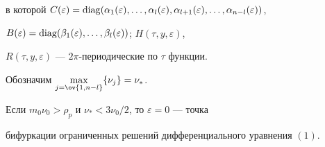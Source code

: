 в которой $C(\varepsilon)=\diag (\alpha_1(\varepsilon),\dotsc, 


\alpha_l(\varepsilon),\alpha_{l+1}(\varepsilon),\dotsc, 


\alpha_{n-l}(\varepsilon))$, 


$B(\varepsilon)=\diag(\beta_1(\varepsilon),\dotsc, 


\beta_l(\varepsilon))$; $H(\tau,y,\varepsilon)$, 


$R(\tau,y,\varepsilon)$ --- $2\pi$-периодические по $\tau$ функции. 


 


Обозначим $\max\limits_{j=\ov{1,n-l}}\{\nu_j\}=\nu_*$. 


 


\begin{thmnonum} 


Если $m_0\nu_0>\rho_p$ и $\nu_*<3\nu_0/2$, то $\varepsilon=0$ --- точка 


бифуркации ограниченных решений дифференциального уравнения $(1)$. 


\end{thmnonum} 


 



